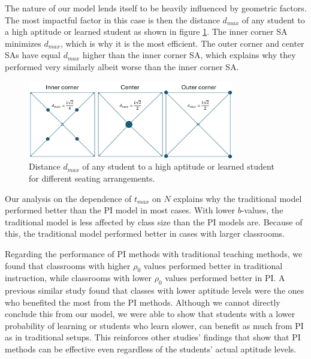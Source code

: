 The nature of our model lends itself to be heavily influenced by geometric factors. 
The most impactful factor in this case is then the distance $d_{max}$ of any student to a high aptitude or learned student as shown in figure \ref{fig:SA dmax}. 
The inner corner SA minimizes $d_{max}$, which is why it is the most efficient. 
The outer corner and center SAs have equal $d_{max}$ higher than the inner corner SA, which explains why they performed very similarly albeit worse than the inner corner SA.

\begin{figure}[htbp!]
    \centering
    \includegraphics[width=0.8\textwidth]{figures/SA dmax.png}
    \caption{Distance $d_{max}$ of any student to a high aptitude or learned student for different seating arrangements.}
    \label{fig:SA dmax}
\end{figure}

Our analysis on the dependence of $t_{max}$ on $N$ explains why the traditional model performed better than the PI model in most cases. 
With lower $b$-values, the traditional model is less affected by class size than the PI models are. 
Because of this, the traditional model performed better in cases with larger classrooms. 

Regarding the performance of PI methods with traditional teaching methods, we found that classrooms with higher $\rho_0$ values performed better in traditional instruction, while classrooms with lower $\rho_0$ values performed better in PI. 
A previous similar study \cite{roxas2010seating} found that classes with lower aptitude levels were the ones who benefited the most from the PI methods.
Although we cannot directly conclude this from our model, we were able to show that students with a lower probability of learning or students who learn slower, can benefit as much from PI as in traditional setups. 
This reinforces other studies' findings \cite{lasry2008peer} that show that PI methods can be effective even regardless of the students' actual aptitude levels.

    
